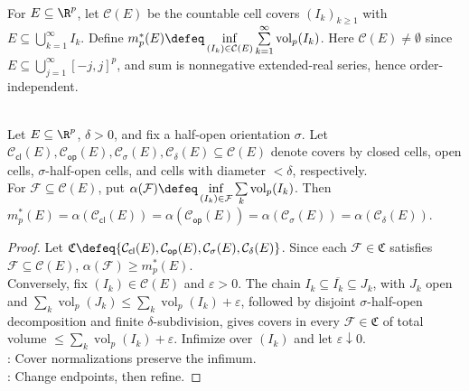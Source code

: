\begin{definition} \label{def:cell-cover-outer-measure} \\
For $E\subseteq\R^p$, let $\mathcal{C}(E)$ be the countable cell covers $(I_k)_{k\geq1}$ with $E\subseteq\bigcup\limits_{k=1}^{\infty}I_k$. Define $m_p^\ast(E)\defeq\inf\limits_{(I_k)\in\mathcal{C}(E)}\sum\limits_{k=1}^{\infty}\operatorname{vol}_p(I_k)$.
Here $\mathcal{C}(E)\neq\emptyset$ since $E\subseteq\bigcup\limits_{j=1}^{\infty}[-j,j]^p$, and sum is nonnegative extended-real series, hence order-independent.
\end{definition}

\begin{proposition} \label{prop:outer-measure-cover-normalizations} \\
Let $E\subseteq\R^p$, $\delta>0$, and fix a half-open orientation $\sigma$. Let $\mathcal{C}_{\mathsf{cl}}(E),\mathcal{C}_{\mathsf{op}}(E),\mathcal{C}_{\sigma}(E),\mathcal{C}_{\delta}(E)\subseteq\mathcal{C}(E)$ denote covers by closed cells, open cells, $\sigma$-half-open cells, and cells with diameter $<\delta$, respectively.\\
For $\mathcal{F}\subseteq\mathcal{C}(E)$, put $\alpha(\mathcal{F})\defeq\inf\limits_{(I_k)\in\mathcal{F}}\sum\limits_k\operatorname{vol}_p(I_k)$. Then $m_p^\ast(E)=\alpha(\mathcal{C}_{\mathsf{cl}}(E))=\alpha(\mathcal{C}_{\mathsf{op}}(E))=\alpha(\mathcal{C}_{\sigma}(E))=\alpha(\mathcal{C}_{\delta}(E))$.
\begin{proof} Let $\mathfrak{C}\defeq\{\mathcal{C}_{\mathsf{cl}}(E),\mathcal{C}_{\mathsf{op}}(E),\mathcal{C}_{\sigma}(E),\mathcal{C}_{\delta}(E)\}$. Since each $\mathcal{F}\in\mathfrak{C}$ satisfies $\mathcal{F}\subseteq\mathcal{C}(E)$, $\alpha(\mathcal{F})\geq m_p^\ast(E)$.\\
Conversely, fix $(I_k)\in\mathcal{C}(E)$ and $\varepsilon>0$. The chain $I_k\subseteq\overline{I_k}\subseteq J_k$, with $J_k$ open and $\sum\limits_k\operatorname{vol}_p(J_k)\leq\sum\limits_k\operatorname{vol}_p(I_k)+\varepsilon$, followed by disjoint $\sigma$-half-open decomposition and finite $\delta$-subdivision, gives covers in every $\mathcal{F}\in\mathfrak{C}$ of total volume $\leq\sum\limits_k\operatorname{vol}_p(I_k)+\varepsilon$. Infimize over $(I_k)$ and let $\varepsilon\downarrow0$.\\
: Cover normalizations preserve the infimum.\\
: Change endpoints, then refine.
\end{proof}
\end{proposition}

